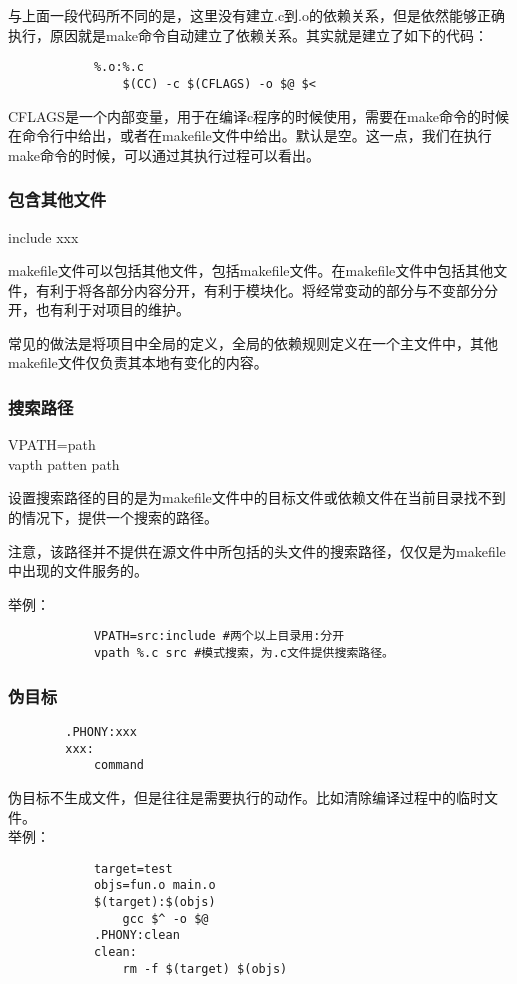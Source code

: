 \documentclass{article}
\begin{document}
\begin{CJK}{UTF8}{gbsn}
		与上面一段代码所不同的是，这里没有建立.c到.o的依赖关系，但是依然能够正确执行，原因就是make命令自动建立了依赖关系。其实就是建立了如下的代码：\par
		\begin{verbatim}
			%.o:%.c
			    $(CC) -c $(CFLAGS) -o $@ $<
		\end{verbatim}


		CFLAGS是一个内部变量，用于在编译c程序的时候使用，需要在make命令的时候在命令行中给出，或者在makefile文件中给出。默认是空。这一点，我们在执行make命令的时候，可以通过其执行过程可以看出。\par
	
	\subsubsection{包含其他文件}
		include xxx\par
		makefile文件可以包括其他文件，包括makefile文件。在makefile文件中包括其他文件，有利于将各部分内容分开，有利于模块化。将经常变动的部分与不变部分分开，也有利于对项目的维护。\par
		常见的做法是将项目中全局的定义，全局的依赖规则定义在一个主文件中，其他makefile文件仅负责其本地有变化的内容。
	\subsubsection{搜索路径}
		\noindent VPATH=path\\
		\noindent vapth patten path 
		\par
		设置搜索路径的目的是为makefile文件中的目标文件或依赖文件在当前目录找不到的情况下，提供一个搜索的路径。\par
		注意，该路径并不提供在源文件中所包括的头文件的搜索路径，仅仅是为makefile中出现的文件服务的。\par
		举例：
		\begin{verbatim}
			VPATH=src:include #两个以上目录用:分开
			vpath %.c src #模式搜索，为.c文件提供搜索路径。
		\end{verbatim}
	\subsubsection{伪目标}
		\begin{verbatim}
		.PHONY:xxx
		xxx:
		    command
		\end{verbatim}\par
		伪目标不生成文件，但是往往是需要执行的动作。比如清除编译过程中的临时文件。\\
		举例：\par
		\begin{verbatim}
			target=test
			objs=fun.o main.o
			$(target):$(objs)
			    gcc $^ -o $@
			.PHONY:clean
			clean:
			    rm -f $(target) $(objs)
		\end{verbatim}

\end{CJK}
\end{document}
